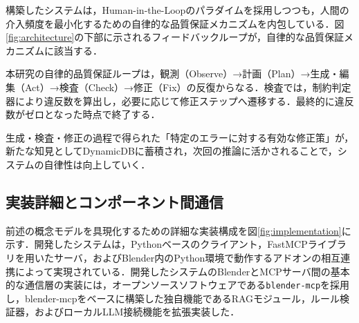 \documentclass[dvipdfmx, a4paper, 9pt]{deimj}
\begin{document}
構築したシステムは，Human-in-the-Loopのパラダイムを採用しつつも，人間の介入頻度を最小化するための自律的な品質保証メカニズムを内包している．図\ref{fig:architecture}の下部に示されるフィードバックループが，自律的な品質保証メカニズムに該当する．

本研究の自律的品質保証ループは，観測（Observe）→計画（Plan）→生成・編集（Act）→検査（Check）→修正（Fix）の反復からなる．検査では，制約判定器により違反数を算出し，必要に応じて修正ステップへ遷移する．最終的に違反数がゼロとなった時点で終了する．

生成・検査・修正の過程で得られた「特定のエラーに対する有効な修正策」が，新たな知見としてDynamicDBに蓄積され，次回の推論に活かされることで，システムの自律性は向上していく．

\subsection{実装詳細とコンポーネント間通信}

前述の概念モデルを具現化するための詳細な実装構成を図\ref{fig:implementation}に示す．開発したシステムは，Pythonベースのクライアント，FastMCPライブラリを用いたサーバ，およびBlender内のPython環境で動作するアドオンの相互連携によって実現されている．開発したシステムのBlenderとMCPサーバ間の基本的な通信層の実装には，オープンソースソフトウェアである\texttt{blender-mcp}\cite{ahuja2025blendermcp}を採用し，blender-mcpをベースに構築した独自機能であるRAGモジュール，ルール検証器，およびローカルLLM接続機能を拡張実装した．
\end{document}
